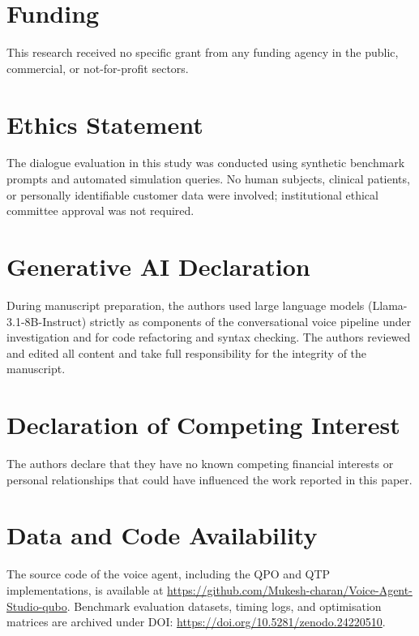 \documentclass[review,12pt,times,authoryear]{elsarticle}
\theoremstyle{definition}
\begin{document}
\section*{Funding}
This research received no specific grant from any funding agency in the public, commercial, or not-for-profit sectors.

\section*{Ethics Statement}
The dialogue evaluation in this study was conducted using synthetic benchmark prompts and automated simulation queries. No human subjects, clinical patients, or personally identifiable customer data were involved; institutional ethical committee approval was not required.

\section*{Generative AI Declaration}
During manuscript preparation, the authors used large language models (Llama-3.1-8B-Instruct) strictly as components of the conversational voice pipeline under investigation and for code refactoring and syntax checking. The authors reviewed and edited all content and take full responsibility for the integrity of the manuscript.

\section*{Declaration of Competing Interest}
The authors declare that they have no known competing financial interests or personal relationships that could have influenced the work reported in this paper.

\section*{Data and Code Availability}
The source code of the voice agent, including the QPO and QTP implementations, is available at \url{https://github.com/Mukesh-charan/Voice-Agent-Studio-qubo}. Benchmark evaluation datasets, timing logs, and optimisation matrices are archived under DOI: \url{https://doi.org/10.5281/zenodo.24220510}.

\setlength{\bibsep}{0.5pt plus 0.2pt minus 0.2pt}


\end{document}
